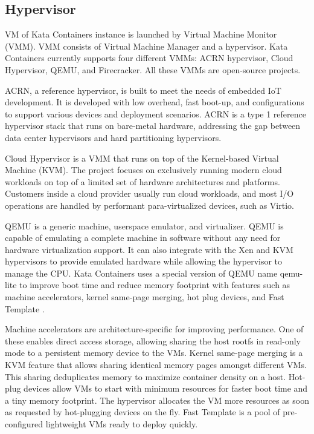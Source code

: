 \subsection{Hypervisor}

VM of Kata Containers instance is launched by Virtual Machine Monitor (VMM). VMM consists of Virtual Machine Manager and a hypervisor. Kata Containers currently supports four different VMMs: ACRN hypervisor, Cloud Hypervisor, QEMU, and Firecracker. All these VMMs are open-source projects.

ACRN, a reference hypervisor, is built to meet the needs of embedded IoT development. It is developed with low overhead, fast boot-up, and configurations to support various devices and deployment scenarios. ACRN is a type 1 reference hypervisor stack that runs on bare-metal hardware, addressing the gap between data center hypervisors and hard partitioning hypervisors. \cite{ACRN}

Cloud Hypervisor is a VMM that runs on top of the Kernel-based Virtual Machine (KVM). The project focuses on exclusively running modern cloud workloads on top of a limited set of hardware architectures and platforms. Customers inside a cloud provider usually run cloud workloads, and most I/O operations are handled by performant para-virtualized devices, such as Virtio. \cite{CloudHypervisor}

QEMU is a generic machine, userspace emulator, and virtualizer. QEMU is capable of emulating a complete machine in software without any need for hardware virtualization support. It can also integrate with the Xen and KVM hypervisors to provide emulated hardware while allowing the hypervisor to manage the CPU. Kata Containers uses a special version of QEMU name qemu-lite to improve boot time and reduce memory footprint with features such as machine accelerators, kernel same-page merging, hot plug devices, and Fast Template \cite{Randazzo2019}. \cite{QEMUGithub}\cite{QEMU}

Machine accelerators are architecture-specific for improving performance. One of these enables direct access storage, allowing sharing the host rootfs in read-only mode to a persistent memory device to the VMs. Kernel same-page merging is a KVM feature that allows sharing identical memory pages amongst different VMs. This sharing deduplicates memory to maximize container density on a host. Hot-plug devices allow VMs to start with minimum resources for faster boot time and a tiny memory footprint. The hypervisor allocates the VM more resources as soon as requested by hot-plugging devices on the fly. Fast Template is a pool of pre-configured lightweight VMs ready to deploy quickly. \cite{Randazzo2019}

